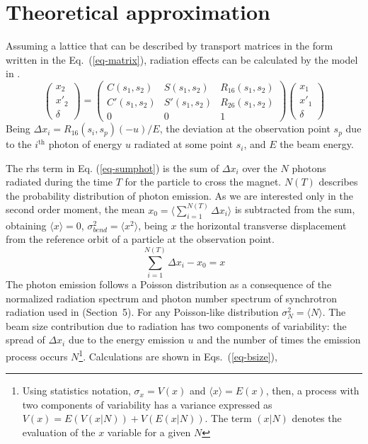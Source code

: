 \section{Theoretical approximation}\label{radtheo}
Assuming a lattice that can be described by transport matrices in the form written in the Eq.~(\ref{eq-matrix}), radiation effects can be calculated by the model in \cite{Sands}.
\begin{equation}
\begin{pmatrix}
x_2\\
x'_2\\
\delta
\end{pmatrix}
=
\begin{pmatrix}
 C(s_1,s_2) & S(s_1,s_2)& R_{16}(s_1,s_2)\\
 C'(s_1,s_2) & S'(s_1,s_2) & R_{26}(s_1,s_2)\\
 0 & 0 &1
\end{pmatrix}
\begin{pmatrix}
x_1\\
x'_1\\
\delta
\end{pmatrix}
\label{eq-matrix}
\end{equation}
Being $\Delta x_i = R_{16}(s_i,s_p) (-u)/E$, the deviation at the observation point $s_p$ due to the $i^{\text{th}}$ photon of energy $u$ radiated at some point $s_i$, and $E$ the beam energy.\par
The rhs term in Eq. (\ref{eq-sumphot}) is the sum of $\Delta x_i$ over the $N$ photons radiated during the time $T$ for the particle to cross the magnet. $N(T)$ describes the probability distribution of photon emission. As we are interested only in the second order moment, the mean  $x_0=\langle\sum_{i=1}^{N(T)}\Delta x_i\rangle$ is subtracted from the sum, obtaining $\langle x\rangle=0$, $ \sigma_{bend}^2=\langle x^2\rangle$, being $x$ the horizontal transverse displacement from the reference orbit of a particle at the observation point.
\begin{equation}
\sum_{i=1}^{N(T)}\Delta x_i - x_0 = x\label{eq-sumphot}
\end{equation}
The photon emission follows a Poisson distribution as a consequence of the normalized radiation spectrum and photon number spectrum of synchrotron radiation used in \cite{Sands2} (Section~5). For any Poisson-like distribution $\sigma_N^2 = \langle N\rangle$. The beam size contribution due to radiation has two components of variability: the spread of $\Delta x_i$ due to the energy emission $u$ and the number of times the emission process occurs $N$\footnote{Using statistics notation, $\sigma_x=V(x)$ and $\langle x\rangle=E(x)$, then, a process with two components of variability has a variance expressed as $V(x)=E(V(x|N))+V(E(x|N))$. The term $(x|N)$ denotes the evaluation of the $x$ variable for a given $N$}. Calculations are shown in Eqs.~(\ref{eq-bsize}),
